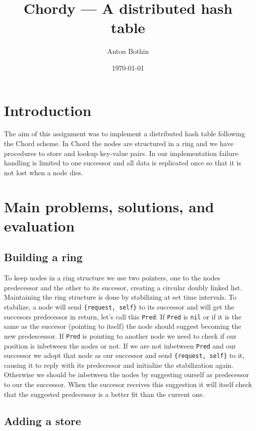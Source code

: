 \documentclass[a4paper, 11pt]{article}
\title{Chordy --- A distributed hash table}
\author{Anton Bothin}
\date{\today{}}
\begin{document}
\maketitle

\section{Introduction}

The aim of this assignment was to implement a distributed hash table following the Chord scheme. In Chord the nodes are structured in a ring and we have procedures to store and lookup key-value pairs. In our implementation failure handling is limited to one successor and all data is replicated once so that it is not lost when a node dies.

\section{Main problems, solutions, and evaluation}

\subsection{Building a ring}

To keep nodes in a ring structure we use two pointers, one to the nodes predecessor and the other to its succesor, creating a circular doubly linked list. Maintaining the ring structure is done by stabilizing at set time intervals. To stabilize, a node will send \texttt{\{request, self\(\)\}} to its successor and will get the succesors predecessor in return, let's call this \texttt{Pred}. If \texttt{Pred} is \texttt{nil} or if it is the same as the succesor (pointing to itself) the node should suggest becoming the new predescessor. If \texttt{Pred} is pointing to another node we need to check if our position is inbetween the nodes or not. If we are not inbetween \texttt{Pred} and our successor we adopt that node as our successor and send \texttt{\{request, self\(\)\}} to it, causing it to reply with its predecessor and initialize the stabilization again. Otherwise we should be inbetween the nodes by suggesting ourself as predecessor to our the successor. When the succesor receives this suggestion it will itself check that the suggested predecessor is a better fit than the current one.

\subsection{Adding a store}
\end{document}
